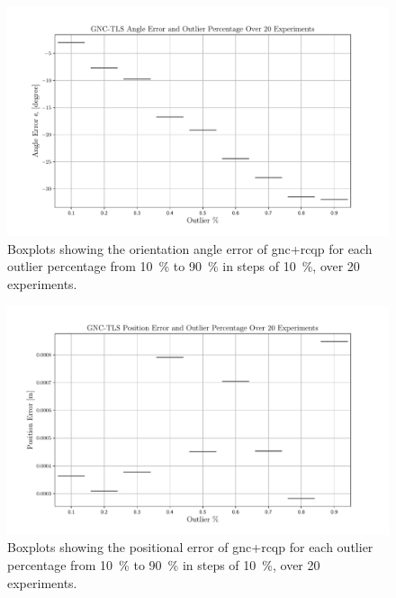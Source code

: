 \begin{figure}[!h]
	\begin{center}
		\includegraphics[width=\textwidth]{chapters/2-pose-estimation/fig/GNC-TLS-theta-e.pdf}
	\end{center}
	\caption{Boxplots showing the orientation angle error  of \gls{gnc}+\gls{rcqp} for each outlier percentage from \SI{10}{\percent} to \SI{90}{\percent} in steps of \SI{10}{\percent}, over \num{20} experiments.}
	\label{fig:GNC-TLS-theta-e}
\end{figure}

\begin{figure}[!h]
	\begin{center}
		\includegraphics[width=\textwidth]{chapters/2-pose-estimation/fig/GNC-TLS-t-e.pdf}
	\end{center}
	\caption{Boxplots showing the positional error of \gls{gnc}+\gls{rcqp} for each outlier percentage from \SI{10}{\percent} to \SI{90}{\percent} in steps of \SI{10}{\percent}, over \num{20} experiments.}
	\label{fig:GNC-TLS-t-e}
\end{figure}


